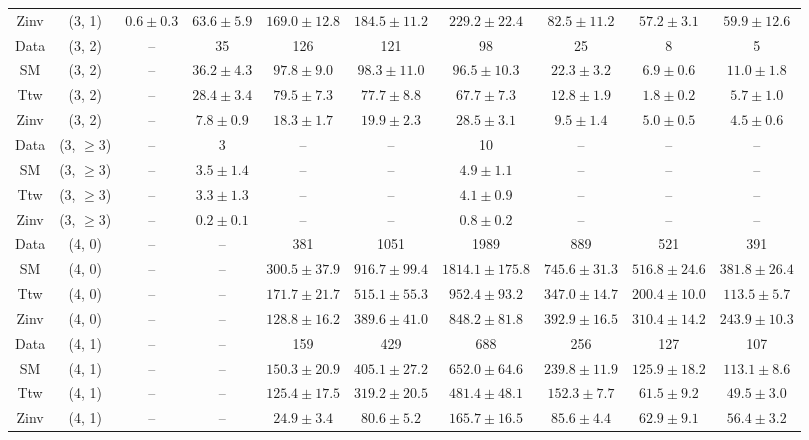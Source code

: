 \begin{table}[h!]
{\begin{tabular}{cccccccccc}
	Zinv & (3, 1) & $0.6\pm 0.3$ & $63.6\pm 5.9$ & $169.0\pm 12.8$ & $184.5\pm 11.2$ & $229.2\pm 22.4$ & $82.5\pm 11.2$ & $57.2\pm 3.1$ & $59.9\pm 12.6$ \\[0.5ex] 
	Data & (3, 2) & -- & 35 & 126 & 121 & 98 & 25 & 8 & 5 \\[0.5ex] 
	SM & (3, 2) & -- & $36.2\pm 4.3$ & $97.8\pm 9.0$ & $98.3\pm 11.0$ & $96.5\pm 10.3$ & $22.3\pm 3.2$ & $6.9\pm 0.6$ & $11.0\pm 1.8$ \\[0.5ex] 
	Ttw & (3, 2) & -- & $28.4\pm 3.4$ & $79.5\pm 7.3$ & $77.7\pm 8.8$ & $67.7\pm 7.3$ & $12.8\pm 1.9$ & $1.8\pm 0.2$ & $5.7\pm 1.0$ \\[0.5ex] 
	Zinv & (3, 2) & -- & $7.8\pm 0.9$ & $18.3\pm 1.7$ & $19.9\pm 2.3$ & $28.5\pm 3.1$ & $9.5\pm 1.4$ & $5.0\pm 0.5$ & $4.5\pm 0.6$ \\[0.5ex] 
	Data & (3, $\ge3$) & -- & 3 & -- & -- & 10 & -- & -- & -- \\[0.5ex] 
	SM & (3, $\ge3$) & -- & $3.5\pm 1.4$ & -- & -- & $4.9\pm 1.1$ & -- & -- & -- \\[0.5ex] 
	Ttw & (3, $\ge3$) & -- & $3.3\pm 1.3$ & -- & -- & $4.1\pm 0.9$ & -- & -- & -- \\[0.5ex] 
	Zinv & (3, $\ge3$) & -- & $0.2\pm 0.1$ & -- & -- & $0.8\pm 0.2$ & -- & -- & -- \\[0.5ex] 
	Data & (4, 0) & -- & -- & 381 & 1051 & 1989 & 889 & 521 & 391 \\[0.5ex] 
	SM & (4, 0) & -- & -- & $300.5\pm 37.9$ & $916.7\pm 99.4$ & $1814.1\pm 175.8$ & $745.6\pm 31.3$ & $516.8\pm 24.6$ & $381.8\pm 26.4$ \\[0.5ex] 
	Ttw & (4, 0) & -- & -- & $171.7\pm 21.7$ & $515.1\pm 55.3$ & $952.4\pm 93.2$ & $347.0\pm 14.7$ & $200.4\pm 10.0$ & $113.5\pm 5.7$ \\[0.5ex] 
	Zinv & (4, 0) & -- & -- & $128.8\pm 16.2$ & $389.6\pm 41.0$ & $848.2\pm 81.8$ & $392.9\pm 16.5$ & $310.4\pm 14.2$ & $243.9\pm 10.3$ \\[0.5ex] 
	Data & (4, 1) & -- & -- & 159 & 429 & 688 & 256 & 127 & 107 \\[0.5ex] 
	SM & (4, 1) & -- & -- & $150.3\pm 20.9$ & $405.1\pm 27.2$ & $652.0\pm 64.6$ & $239.8\pm 11.9$ & $125.9\pm 18.2$ & $113.1\pm 8.6$ \\[0.5ex] 
	Ttw & (4, 1) & -- & -- & $125.4\pm 17.5$ & $319.2\pm 20.5$ & $481.4\pm 48.1$ & $152.3\pm 7.7$ & $61.5\pm 9.2$ & $49.5\pm 3.0$ \\[0.5ex] 
	Zinv & (4, 1) & -- & -- & $24.9\pm 3.4$ & $80.6\pm 5.2$ & $165.7\pm 16.5$ & $85.6\pm 4.4$ & $62.9\pm 9.1$ & $56.4\pm 3.2$ \\[0.5ex] 

\end{tabular}}
\end{table}
